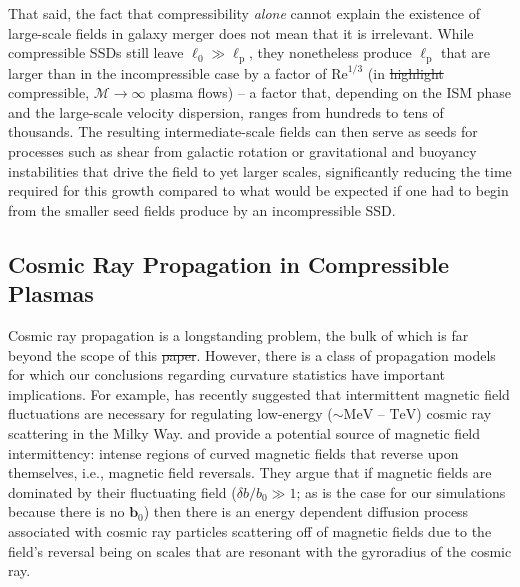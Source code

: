 \documentclass[12pt,twoside]{extreport}
\makeatletter
\newcommand{\mVector}[1]{\bm{#1}} %
\newcommand{\mReh}{\ensuremath{\mathrm{Re}}} %
\newcommand{\mSonicMach}{\ensuremath{\mathcal{M}}} %
\newcommand{\ie}{i.e.,\xspace} %
\providecommand{\DIFaddtex}[1]{{\protect\color{DIFgreen}\uwave{#1}}} %
\providecommand{\DIFdeltex}[1]{{\protect\color{DIFpurple}\sout{#1}}} %
\providecommand{\DIFaddbegin}{} %
\providecommand{\DIFaddend}{} %
\providecommand{\DIFdelbegin}{} %
\providecommand{\DIFdelend}{} %
\providecommand{\DIFadd}[1]{\texorpdfstring{\DIFaddtex{#1}}{#1}} %
\providecommand{\DIFdel}[1]{\texorpdfstring{\DIFdeltex{#1}}{}} %
\providecommand{\DIFscaledelfig}{0.5}
\newlength{\DIFdelgraphicswidth} %
\newlength{\DIFdelgraphicsheight} %
\providecommand{\DIFaddincludegraphics}[2][]{{\color{DIFgreen}\fbox{\DIFOincludegraphics[#1]{#2}}}} %
\providecommand{\DIFdelincludegraphics}[2][]{%
\sbox{\DIFdelgraphicsbox}{\DIFOincludegraphics[#1]{#2}}%
\settoboxwidth{\DIFdelgraphicswidth}{\DIFdelgraphicsbox} %
\settoboxtotalheight{\DIFdelgraphicsheight}{\DIFdelgraphicsbox} %
\scalebox{\DIFscaledelfig}{%
\parbox[b]{\DIFdelgraphicswidth}{\usebox{\DIFdelgraphicsbox}\\[-\baselineskip] \rule{\DIFdelgraphicswidth}{0em}}\llap{\resizebox{\DIFdelgraphicswidth}{\DIFdelgraphicsheight}{%
\setlength{\unitlength}{\DIFdelgraphicswidth}%
\begin{picture}(1,1)%
\thicklines\linethickness{2pt} %
{\color{DIFpurple}\put(0,0){\framebox(1,1){}}}%
{\color{DIFpurple}\put(0,0){\line( 1,1){1}}}%
{\color{DIFpurple}\put(0,1){\line(1,-1){1}}}%
\end{picture}%
}\hspace*{3pt}}} %
} %
\DeclareRobustCommand{\DIFaddbegin}{\DIFOaddbegin \let\includegraphics\DIFaddincludegraphics} %
\DeclareRobustCommand{\DIFaddend}{\DIFOaddend \let\includegraphics\DIFOincludegraphics} %
\DeclareRobustCommand{\DIFdelbegin}{\DIFOdelbegin \let\includegraphics\DIFdelincludegraphics} %
\DeclareRobustCommand{\DIFdelend}{\DIFOaddend \let\includegraphics\DIFOincludegraphics} %
\let\sout@orig\sout %
\renewcommand{\sout}[1]{\ifmmode\text{\sout@orig{\ensuremath{#1}}}\else\sout@orig{#1}\fi} %
\makeatother
\begin{document}
That said, the fact that compressibility \textit{alone} cannot explain the existence of large-scale fields in galaxy merger does not mean that it is irrelevant. While compressible SSDs still leave \DIFdelbegin \DIFdel{$\ell_0 \gg \ell_\mathrm{p}$}\DIFdelend \DIFaddbegin \DIFadd{$\ell_\mathrm{turb} \gg \ell_\mathrm{p}$}\DIFaddend , they nonetheless produce $\ell_\mathrm{p}$ that are larger than in the incompressible case by a factor of $\mReh^{1/3}$ (in \DIFdelbegin \DIFdel{highlight }\DIFdelend \DIFaddbegin \DIFadd{highly }\DIFaddend compressible, $\mSonicMach\to\infty$ plasma flows) -- a factor that, depending on the ISM phase and the large-scale velocity dispersion, ranges from hundreds to tens of thousands. The resulting intermediate-scale fields can then serve as seeds for processes such as shear from galactic rotation or gravitational and buoyancy instabilities \citep[e.g.][]{pakmor2017magnetic, steinwandel2023towards} that drive the field to yet larger scales, significantly reducing the time required for this growth compared to what would be expected if one had to begin from the smaller seed fields produce by an incompressible SSD.

\subsection{Cosmic Ray Propagation in Compressible Plasmas}

Cosmic ray propagation is a longstanding problem, the bulk of which is far beyond the scope of this \DIFdelbegin \DIFdel{paper}\DIFdelend \DIFaddbegin \DIFadd{chapter}\DIFaddend . However, there is a class of propagation models for which our conclusions regarding curvature statistics have important implications. For example, \citet{butsky2023galactic} has recently suggested that intermittent magnetic field fluctuations are necessary for regulating low-energy ($\sim \mathrm{MeV}$ -- $\mathrm{TeV}$) cosmic ray scattering in the Milky Way. \citet{kempski2023cosmic} and \citet{Lemoine2023_field_reversal_CR_transport} provide a potential source of magnetic field intermittency: intense regions of curved magnetic fields that reverse upon themselves, \ie magnetic field reversals. They argue that if magnetic fields are dominated by their fluctuating field ($\delta b/b_0 \gg 1$; as is the case for our simulations because there is no $\mVector{b}_0$) then there is an energy dependent diffusion process associated with cosmic ray particles scattering off of magnetic fields due to the field's reversal being on scales that are resonant with the gyroradius of the cosmic ray.
\end{document}
